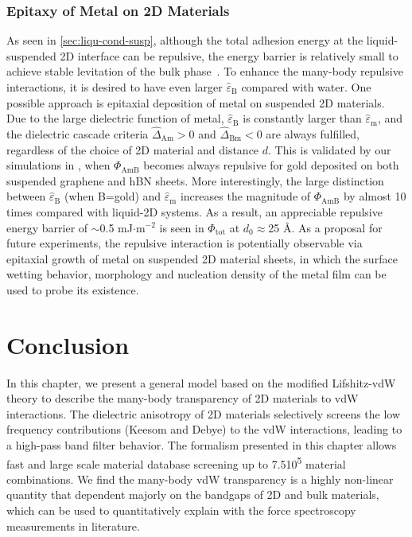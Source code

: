 \subsubsection{Epitaxy of Metal on 2D Materials}
\label{sec:epitaxy-metal-2d}

As seen in \autoref{sec:liqu-cond-susp}, although the total adhesion
energy at the liquid-suspended 2D interface can be repulsive, the
energy barrier is relatively small to achieve stable levitation of the
bulk phase~\cite{Zhao_2019_casimir_trap}.
%
To enhance the many-body repulsive interactions, it is desired to have
even larger $\hat{\varepsilon}_{\mathrm{B}}$ compared with water. One
possible approach is epitaxial deposition of metal on suspended 2D
materials.
%
Due to the large dielectric function of metal,
$\hat{\varepsilon}_{\mathrm{B}}$ is constantly larger than
$\hat{\varepsilon}_{\mathrm{m}}$, and the dielectric cascade criteria
$\hat{\Delta}_{\mathrm{Am}} > 0$ and $\hat{\Delta}_{\mathrm{Bm}} < 0$
are always fulfilled, regardless of the choice of 2D material and
distance $d$.
%
This is validated by our simulations in , when
$\Phi_{\mathrm{AmB}}$ becomes always repulsive for gold deposited on
both suspended graphene and hBN sheets.
%
More interestingly, the large distinction between
$\hat{\varepsilon}_{\mathrm{B}}$ (when B=gold) and
$\hat{\varepsilon}_{\mathrm{m}}$ 
increases the magnitude of $\Phi_{\mathrm{AmB}}$ by almost 10 times
compared with liquid-2D systems. As a result, an appreciable repulsive
energy barrier of $\sim{}$0.5 mJ$\cdot$m$^{-2}$ is seen in
$\Phi_{\mathrm{tot}}$ at $d_{0} \approx$25 \AA{}.
%
%
As a proposal for future experiments, the repulsive interaction is
potentially observable via epitaxial growth of metal on suspended 2D
material sheets, in which the surface wetting behavior, morphology and
nucleation density of the metal film can be used to probe its
existence.



\section{Conclusion}
\label{sec:vdw-conclusion}

In this chapter, we present a general model based on the modified
Lifshitz-vdW theory to describe the many-body transparency of 2D materials
to vdW interactions.
%
The dielectric anisotropy of 2D materials selectively screens the 
low frequency contributions (Keesom and Debye) to the vdW interactions, leading to a high-pass band filter behavior.
%
The formalism presented in this chapter allows fast and large scale
material database screening up to 7.5\texttimes{}10\textsuperscript{5}
material combinations.
%
We find the many-body vdW transparency is a highly non-linear quantity
that dependent majorly on the bandgaps of 2D and bulk materials, which
can be used to quantitatively explain with the force spectroscopy measurements in literature.


